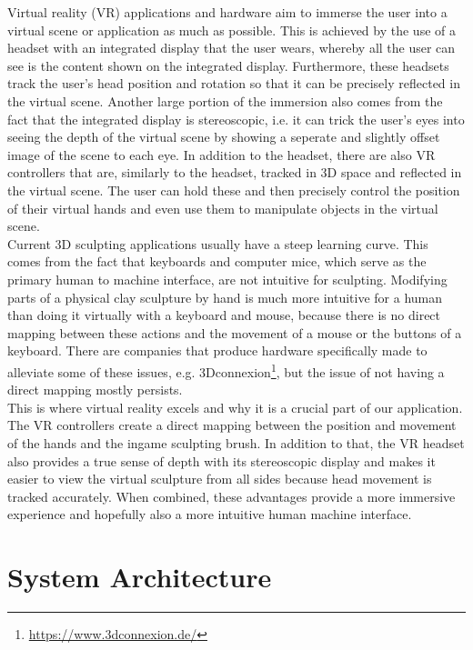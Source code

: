 Virtual reality (VR) applications and hardware aim to immerse the user into a virtual scene or application as much as possible. This is achieved by the use of a headset with an integrated display that the user wears, whereby all the user can see is the content shown on the integrated display. Furthermore, these headsets track the user's head position and rotation so that it can be precisely reflected in the virtual scene. Another large portion of the immersion also comes from the fact that the integrated display is stereoscopic, i.e. it can trick the user's eyes into seeing the depth of the virtual scene by showing a seperate and slightly offset image of the scene to each eye. In addition to the headset, there are also VR controllers that are, similarly to the headset, tracked in 3D space and reflected in the virtual scene. The user can hold these and then precisely control the position of their virtual hands and even use them to manipulate objects in the virtual scene.\\
Current 3D sculpting applications usually have a steep learning curve. This comes from the fact that keyboards and computer mice, which serve as the primary human to machine interface, are not intuitive for
sculpting. Modifying parts of a physical clay sculpture by hand is much more intuitive for a human than doing it virtually with a keyboard and mouse, because there is no direct mapping between these actions
and the movement of a mouse or the buttons of a keyboard. There are companies that produce hardware specifically made to alleviate some of these issues, e.g. 3Dconnexion\footnote{\url{https://www.3dconnexion.de/}}, but the issue
of not having a direct mapping mostly persists.\\
This is where virtual reality excels and why it is a crucial part of our application. The VR controllers create a direct mapping between the position and movement of the hands and the ingame sculpting brush. In addition to that,
the VR headset also provides a true sense of depth with its stereoscopic display and makes it easier to view the virtual sculpture from all sides because head movement is tracked accurately. When combined, these advantages provide
a more immersive experience and hopefully also a more intuitive human machine interface.

\section{System Architecture}

